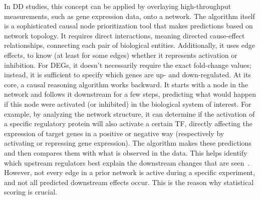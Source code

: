 In \gls{DD} studies, this concept can be applied by overlaying high-throughput measurements, such as gene expression data, onto a network. 
The algorithm itself is a sophisticated causal node prioritization tool that makes predictions based on network topology. 
It requires direct interactions, meaning directed cause-effect relationships, connecting each pair of biological entities. 
Additionally, it uses edge effects, to know (at least for some edges) whether it represents activation or inhibition. 
For \gls{DEGs}, it doesn't necessarily require the exact fold-change values; instead, it is sufficient to specify which genes are up- and down-regulated. 
At its core, a causal reasoning algorithm works backward. It starts with a node in the network and follows it downstream for a few steps, predicting what would happen if this node were activated (or inhibited) in the biological system of interest. 
For example, by analyzing the network structure, it can determine if the activation of a specific regulatory protein will also activate a certain TF, directly affecting the expression of target genes in a positive or negative way (respectively by activating or repressing gene expression). 
The algorithm makes these predictions and then compares them with what is observed in the data. 
This helps identify which upstream regulators best explain the downstream changes that are seen~\cite{RN32}. 
However, not every edge in a prior network is active during a specific experiment, and not all predicted downstream effects occur. 
This is the reason why statistical scoring is crucial. 

